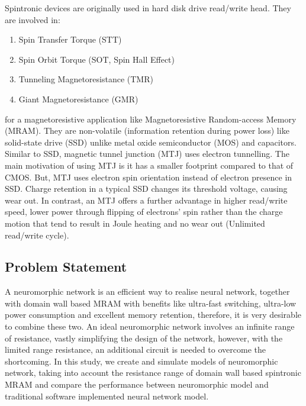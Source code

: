 Spintronic devices are originally used in hard disk drive read/write head. They are involved in:
\begin{enumerate}
	\item Spin Transfer Torque (STT)
	\item Spin Orbit Torque (SOT, Spin Hall Effect)
	\item Tunneling Magnetoresistance (TMR)
	\item Giant Magnetoresistance (GMR)
\end{enumerate}
for a magnetoresistive application like Magnetoresistive Random-access Memory (MRAM). They are non-volatile (information retention during power loss) like solid-state drive (SSD) unlike metal oxide semiconductor (MOS) and capacitors. Similar to SSD, magnetic tunnel junction (MTJ) uses electron tunnelling. The main motivation of using MTJ is it has a smaller footprint compared to that of CMOS. But, MTJ uses electron spin orientation instead of electron presence in SSD. Charge retention in a typical SSD changes its threshold voltage, causing wear out. In contrast, an MTJ offers a further advantage in higher read/write speed, lower power through flipping of electrons’ spin rather than the charge motion that tend to result in Joule heating and no wear out (Unlimited read/write cycle).

\subsection{Problem Statement}
A neuromorphic network is an efficient way to realise neural network, together with domain wall based MRAM with benefits like ultra-fast switching, ultra-low power consumption and excellent memory retention, therefore, it is very desirable to combine these two.
An ideal neuromorphic network involves an infinite range of resistance, vastly simplifying the design of the network, however, with the limited range resistance, an additional circuit is needed to overcome the shortcoming. In this study, we create and simulate models of neuromorphic network, taking into account the resistance range of domain wall based spintronic MRAM and compare the performance between neuromorphic model and traditional software implemented neural network model.

